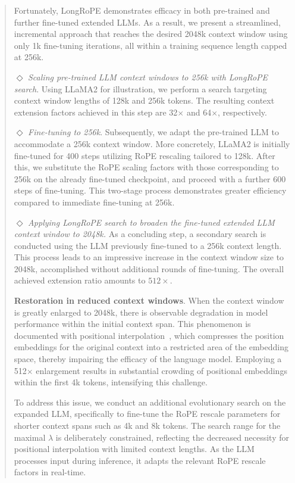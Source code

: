 \begin{abstract}
Fortunately, LongRoPE demonstrates efficacy in both pre-trained and further fine-tuned extended LLMs. As a result, we present a streamlined, incremental approach that reaches the desired 2048k context window using only 1k fine-tuning iterations, all within a training sequence length capped at 256k.

$\Diamond$ \textit{Scaling pre-trained LLM context windows to 256k with LongRoPE search}. Using LLaMA2 for illustration, we perform a search targeting context window lengths of 128k and 256k tokens. The resulting context extension factors achieved in this step are 32$\times$ and 64$\times$, respectively.

$\Diamond$ \textit{Fine-tuning to 256k}. Subsequently, we adapt the pre-trained LLM to accommodate a 256k context window. More concretely, LLaMA2 is initially fine-tuned for 400 steps utilizing RoPE rescaling tailored to 128k. After this, we substitute the RoPE scaling factors with those corresponding to 256k on the already fine-tuned checkpoint, and proceed with a further 600 steps of fine-tuning. This two-stage process demonstrates greater efficiency compared to immediate fine-tuning at 256k.

$\Diamond$ \textit{Applying LongRoPE search to broaden the fine-tuned extended LLM context window to 2048k.} As a concluding step, a secondary search is conducted using the LLM previously fine-tuned to a 256k context length. This process leads to an impressive increase in the context window size to 2048k, accomplished without additional rounds of fine-tuning. The overall achieved extension ratio amounts to $512\times$.

\textbf{Restoration in reduced context windows}. When the context window is greatly enlarged to 2048k, there is observable degradation in model performance within the initial context span. This phenomenon is documented with positional interpolation~\cite{pi}, which compresses the position embeddings for the original context into a restricted area of the embedding space, thereby impairing the efficacy of the language model. Employing a 512$\times$ enlargement results in substantial crowding of positional embeddings within the first 4k tokens, intensifying this challenge.

To address this issue, we conduct an additional evolutionary search on the expanded LLM, specifically to fine-tune the RoPE rescale parameters for shorter context spans such as 4k and 8k tokens. The search range for the maximal $\lambda$ is deliberately constrained, reflecting the decreased necessity for positional interpolation with limited context lengths. As the LLM processes input during inference, it adapts the relevant RoPE rescale factors in real-time.


\end{abstract}
